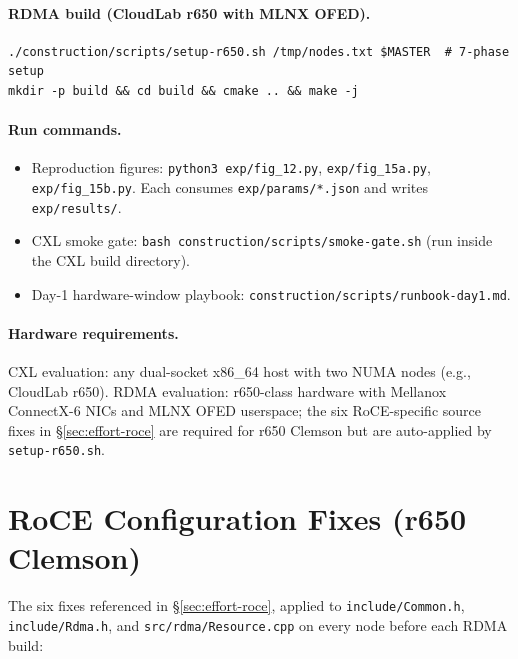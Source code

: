 \documentclass[11pt,a4paper]{article}
\begin{document}
\paragraph{RDMA build (CloudLab r650 with MLNX OFED).}
\begin{lstlisting}
./construction/scripts/setup-r650.sh /tmp/nodes.txt $MASTER  # 7-phase setup
mkdir -p build && cd build && cmake .. && make -j
\end{lstlisting}

\paragraph{Run commands.}
\begin{itemize}[nosep]
    \item Reproduction figures: \texttt{python3 exp/fig\_12.py}, \texttt{exp/fig\_15a.py}, \texttt{exp/fig\_15b.py}. Each consumes \texttt{exp/params/*.json} and writes \texttt{exp/results/}.
    \item CXL smoke gate: \texttt{bash construction/scripts/smoke-gate.sh} (run inside the CXL build directory).
    \item Day-1 hardware-window playbook: \texttt{construction/scripts/runbook-day1.md}.
\end{itemize}

\paragraph{Hardware requirements.} CXL evaluation: any dual-socket x86\_64 host with two NUMA nodes (e.g., CloudLab r650). RDMA evaluation: r650-class hardware with Mellanox ConnectX-6 NICs and MLNX OFED userspace; the six RoCE-specific source fixes in §\ref{sec:effort-roce} are required for r650 Clemson but are auto-applied by \texttt{setup-r650.sh}.

\section{RoCE Configuration Fixes (r650 Clemson)}
\label{app:roce-fixes}

The six fixes referenced in §\ref{sec:effort-roce}, applied to \texttt{include/Common.h}, \texttt{include/Rdma.h}, and \texttt{src/rdma/Resource.cpp} on every node before each RDMA build:
\end{document}
